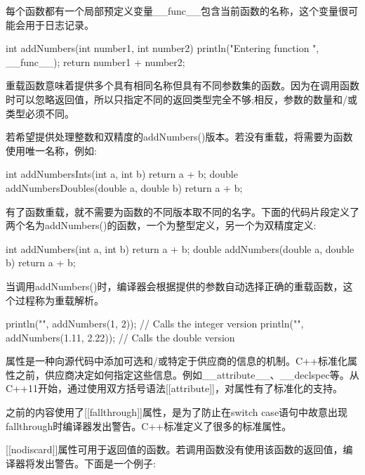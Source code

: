 
每个函数都有一个局部预定义变量\_\_func\_\_包含当前函数的名称，这个变量很可能会用于日志记录。

\begin{cpp}
int addNumbers(int number1, int number2)
{
    println("Entering function {}", __func__);
    return number1 + number2;
}
\end{cpp}


重载函数意味着提供多个具有相同名称但具有不同参数集的函数。因为在调用函数时可以忽略返回值，所以只指定不同的返回类型完全不够;相反，参数的数量和/或类型必须不同。

若希望提供处理整数和双精度的addNumbers()版本。若没有重载，将需要为函数使用唯一名称，例如:

\begin{cpp}
int addNumbersInts(int a, int b) { return a + b; }
double addNumbersDoubles(double a, double b) { return a + b; }
\end{cpp}

有了函数重载，就不需要为函数的不同版本取不同的名字。下面的代码片段定义了两个名为addNumbers()的函数，一个为整型定义，另一个为双精度定义:

\begin{cpp}
int addNumbers(int a, int b) { return a + b; }
double addNumbers(double a, double b) { return a + b; }
\end{cpp}

当调用addNumbers()时，编译器会根据提供的参数自动选择正确的重载函数，这个过程称为重载解析。

\begin{cpp}
println("{}", addNumbers(1, 2)); // Calls the integer version
println("{}", addNumbers(1.11, 2.22)); // Calls the double version
\end{cpp}


属性是一种向源代码中添加可选和/或特定于供应商的信息的机制。C++标准化属性之前，供应商决定如何指定这些信息。例如\_\_attribute\_\_、\_\_declspec等。从C++11开始，通过使用双方括号语法[[attribute]]，对属性有了标准化的支持。

之前的内容使用了[[fallthrough]]属性，是为了防止在switch case语句中故意出现fallthrough时编译器发出警告。C++标准定义了很多的标准属性。

\mySamllsection{[[nodiscard]]}

[[nodiscard]]属性可用于返回值的函数。若调用函数没有使用该函数的返回值，编译器将发出警告。下面是一个例子:

